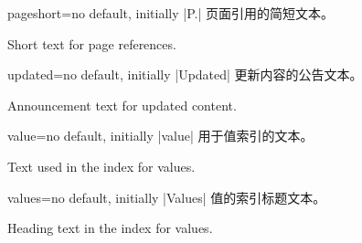 \begin{langTcbKey}{pageshort}{=}{no default, initially |P.|}
页面引用的简短文本。

Short text for page references.
\end{langTcbKey}

\begin{langTcbKey}[][doc new={2014-09-19}]{updated}{=}{no default, initially |Updated|}
更新内容的公告文本。

Announcement text for updated content.
\end{langTcbKey}

\begin{langTcbKey}{value}{=}{no default, initially |value|}
用于值索引的文本。

Text used in the index for values.
\end{langTcbKey}

\begin{langTcbKey}{values}{=}{no default, initially |Values|}
值的索引标题文本。

Heading text in the index for values.
\end{langTcbKey}